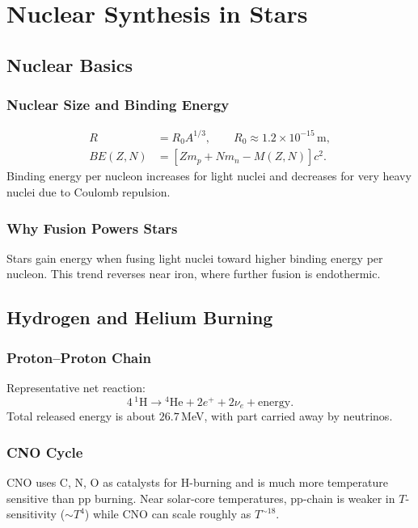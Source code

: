 \chapter{Nuclear Synthesis in Stars}

\section{Nuclear Basics}

\subsection{Nuclear Size and Binding Energy}
\begin{theory}
\begin{align}
    R &= R_0A^{1/3}, \qquad R_0\approx1.2\times10^{-15}\,\text{m}, \\
    BE(Z,N) &= \left[Zm_p+Nm_n-M(Z,N)\right]c^2.
\end{align}
Binding energy per nucleon increases for light nuclei and decreases for very heavy nuclei due to Coulomb repulsion.
\end{theory}

\subsection{Why Fusion Powers Stars}
\begin{intuition}
Stars gain energy when fusing light nuclei toward higher binding energy per nucleon.
This trend reverses near iron, where further fusion is endothermic.
\end{intuition}

\section{Hydrogen and Helium Burning}

\subsection{Proton--Proton Chain}
\begin{theory}
Representative net reaction:
\begin{equation}
    4\,{}^1\text{H}\rightarrow{}^4\text{He}+2e^++2\nu_e+\text{energy}.
\end{equation}
Total released energy is about $26.7\,$MeV, with part carried away by neutrinos.
\end{theory}

\subsection{CNO Cycle}
\begin{theory}
CNO uses C, N, O as catalysts for H-burning and is much more temperature sensitive than pp burning.
Near solar-core temperatures, pp-chain is weaker in $T$-sensitivity ($\sim T^4$) while CNO can scale roughly as $T^{\sim 18}$.
\end{theory}

